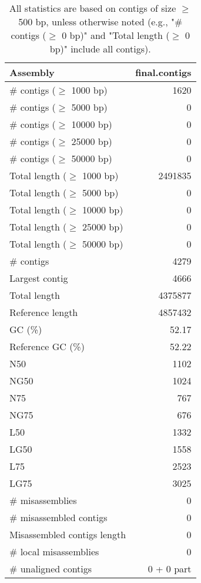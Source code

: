 \documentclass[12pt,a4paper]{article}
\begin{document}
\begin{table}[ht]
\begin{center}
\caption{All statistics are based on contigs of size $\geq$ 500 bp, unless otherwise noted (e.g., "\# contigs ($\geq$ 0 bp)" and "Total length ($\geq$ 0 bp)" include all contigs).}
\begin{tabular}{|l*{1}{|r}|}
\hline
Assembly & final.contigs \\ \hline
\# contigs ($\geq$ 1000 bp) & 1620 \\ \hline
\# contigs ($\geq$ 5000 bp) & 0 \\ \hline
\# contigs ($\geq$ 10000 bp) & 0 \\ \hline
\# contigs ($\geq$ 25000 bp) & 0 \\ \hline
\# contigs ($\geq$ 50000 bp) & 0 \\ \hline
Total length ($\geq$ 1000 bp) & 2491835 \\ \hline
Total length ($\geq$ 5000 bp) & 0 \\ \hline
Total length ($\geq$ 10000 bp) & 0 \\ \hline
Total length ($\geq$ 25000 bp) & 0 \\ \hline
Total length ($\geq$ 50000 bp) & 0 \\ \hline
\# contigs & 4279 \\ \hline
Largest contig & 4666 \\ \hline
Total length & 4375877 \\ \hline
Reference length & 4857432 \\ \hline
GC (\%) & 52.17 \\ \hline
Reference GC (\%) & 52.22 \\ \hline
N50 & 1102 \\ \hline
NG50 & 1024 \\ \hline
N75 & 767 \\ \hline
NG75 & 676 \\ \hline
L50 & 1332 \\ \hline
LG50 & 1558 \\ \hline
L75 & 2523 \\ \hline
LG75 & 3025 \\ \hline
\# misassemblies & 0 \\ \hline
\# misassembled contigs & 0 \\ \hline
Misassembled contigs length & 0 \\ \hline
\# local misassemblies & 0 \\ \hline
\# unaligned contigs & 0 + 0 part \\ \hline

\end{tabular}
\end{center}
\end{table}
\end{document}
